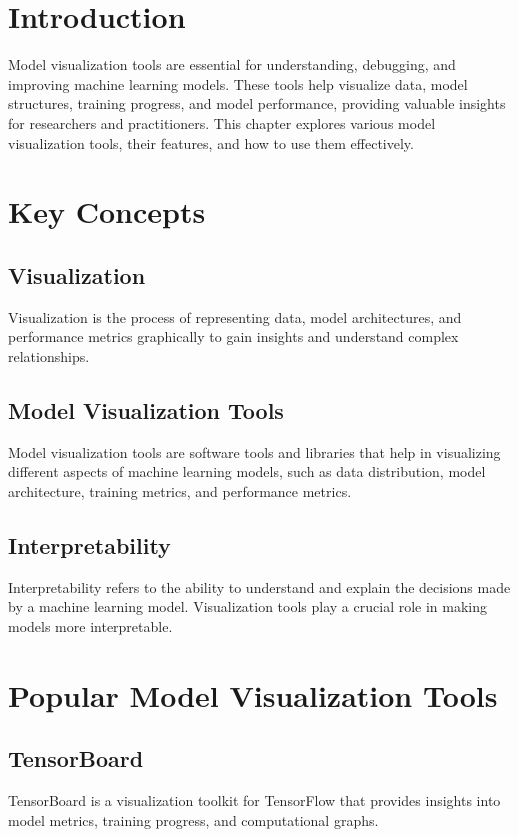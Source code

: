 \section{Introduction}
Model visualization tools are essential for understanding, debugging, and improving machine learning models. These tools help visualize data, model structures, training progress, and model performance, providing valuable insights for researchers and practitioners. This chapter explores various model visualization tools, their features, and how to use them effectively.

\section{Key Concepts}

\subsection{Visualization}
Visualization is the process of representing data, model architectures, and performance metrics graphically to gain insights and understand complex relationships.

\subsection{Model Visualization Tools}
Model visualization tools are software tools and libraries that help in visualizing different aspects of machine learning models, such as data distribution, model architecture, training metrics, and performance metrics.

\subsection{Interpretability}
Interpretability refers to the ability to understand and explain the decisions made by a machine learning model. Visualization tools play a crucial role in making models more interpretable.

\section{Popular Model Visualization Tools}

\subsection{TensorBoard}
TensorBoard is a visualization toolkit for TensorFlow that provides insights into model metrics, training progress, and computational graphs.

